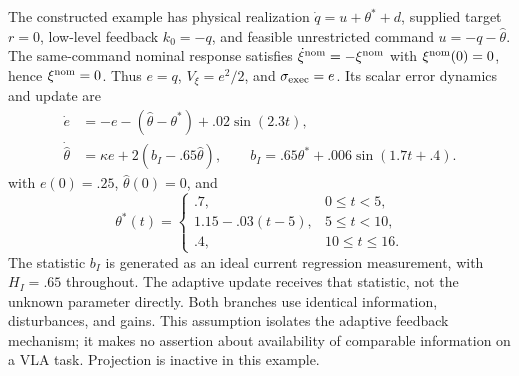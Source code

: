 The constructed example has physical realization
$\dot q=u+\theta^*+d$, supplied target $r=0$, low-level feedback $k_0=-q$,
and feasible unrestricted command $u=-q-\hat\theta$. The same-command
nominal response satisfies $\dot\xi^{\rm nom}=-\xi^{\rm nom}$ with $\xi^{\rm nom}(0)=0$, hence
$\xi^{\rm nom}=0$. Thus $e=q$, $V_\xi=e^2/2$, and $\sigma_{\rm exec}=e$.
Its scalar error dynamics and update are
\begin{equation}
\begin{aligned}
\dot e&=-e-(\hat\theta-\theta^*)+.02\sin(2.3t),\\
\dot{\hat\theta}&=\kappa e+2(b_I-.65\hat\theta),
\qquad b_I=.65\theta^*+.006\sin(1.7t+.4).
\end{aligned}
\label{eq:constructed-system}
\end{equation}
with $e(0)=.25$, $\hat\theta(0)=0$, and
\begin{equation}
\theta^*(t)=\begin{cases}.7,&0\le t<5,\\
1.15-.03(t-5),&5\le t<10,\\.4,&10\le t\le16.\end{cases}
\end{equation}
The statistic $b_I$ is generated as an ideal current regression measurement,
with $H_I=.65$ throughout. The adaptive update receives that statistic, not
the unknown parameter directly. Both branches use identical information,
disturbances, and gains. This assumption isolates the adaptive feedback
mechanism; it makes no assertion about availability of comparable information
on a VLA task. Projection is inactive in this example.

